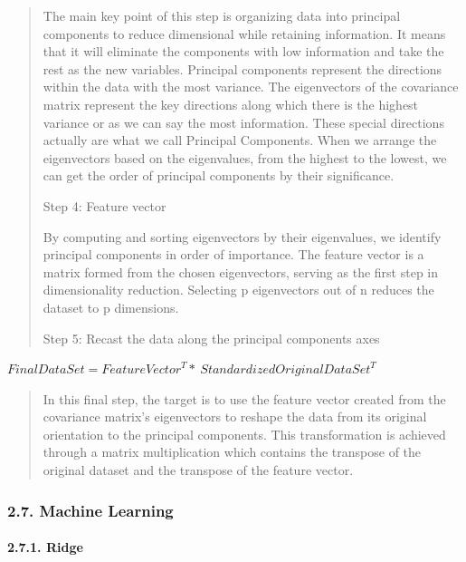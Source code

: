 \documentclass[
]{article}
\begin{document}
\begin{quote}
The main key point of this step is organizing data into principal
components to reduce dimensional while retaining information. It means
that it will eliminate the components with low information and take the
rest as the new variables. Principal components represent the directions
within the data with the most variance. The eigenvectors of the
covariance matrix represent the key directions along which there is the
highest variance or as we can say the most information. These special
directions actually are what we call Principal Components. When we
arrange the eigenvectors based on the eigenvalues, from the highest to
the lowest, we can get the order of principal components by their
significance.

Step 4: Feature vector

By computing and sorting eigenvectors by their eigenvalues, we identify
principal components in order of importance. The feature vector is a
matrix formed from the chosen eigenvectors, serving as the first step in
dimensionality reduction. Selecting p eigenvectors out of n reduces the
dataset to p dimensions.

Step 5: Recast the data along the principal components axes
\end{quote}

\(FinalDataSet = {FeatureVector}^{T}*\ {StandardizedOriginalDataSet}^{T}\)

\begin{quote}
In this final step, the target is to use the feature vector created from
the covariance matrix's eigenvectors to reshape the data from its
original orientation to the principal components. This transformation is
achieved through a matrix multiplication which contains the transpose of
the original dataset and the transpose of the feature vector.
\end{quote}

\hypertarget{machine-learning}{%
\subsubsection{\texorpdfstring{\textbf{2.7. Machine
Learning}}{2.7. Machine Learning}}\label{machine-learning}}

\hypertarget{ridge}{%
\paragraph{\texorpdfstring{\textbf{2.7.1.
Ridge}}{2.7.1. Ridge}}\label{ridge}}
\end{document}
